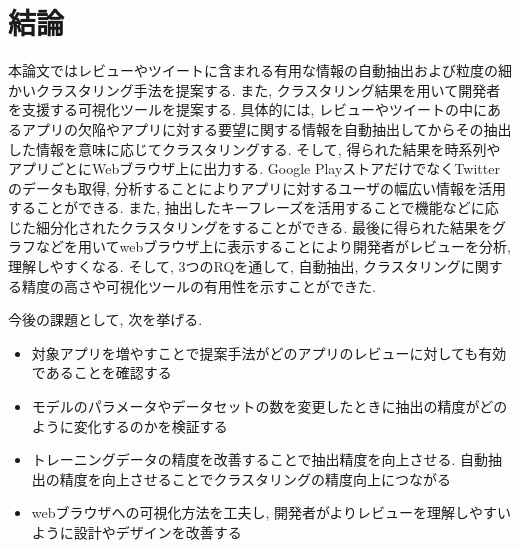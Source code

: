 \chapter{結論}
\label{chap:keturon}

本論文ではレビューやツイートに含まれる有用な情報の自動抽出および粒度の細かいクラスタリング手法を提案する. また, クラスタリング結果を用いて開発者を支援する可視化ツールを提案する. 
具体的には, レビューやツイートの中にあるアプリの欠陥やアプリに対する要望に関する情報を自動抽出してからその抽出した情報を意味に応じてクラスタリングする.  そして, 得られた結果を時系列やアプリごとにWebブラウザ上に出力する.
Google PlayストアだけでなくTwitterのデータも取得, 分析することによりアプリに対するユーザの幅広い情報を活用することができる. また, 抽出したキーフレーズを活用することで機能などに応じた細分化されたクラスタリングをすることができる. 最後に得られた結果をグラフなどを用いてwebブラウザ上に表示することにより開発者がレビューを分析, 理解しやすくなる. 
そして, 3つのRQを通して, 自動抽出, クラスタリングに関する精度の高さや可視化ツールの有用性を示すことができた. 

今後の課題として, 次を挙げる. 

\begin{itemize}
    \item 対象アプリを増やすことで提案手法がどのアプリのレビューに対しても有効であることを確認する
    \item モデルのパラメータやデータセットの数を変更したときに抽出の精度がどのように変化するのかを検証する
    \item トレーニングデータの精度を改善することで抽出精度を向上させる. 自動抽出の精度を向上させることでクラスタリングの精度向上につながる
    \item webブラウザへの可視化方法を工夫し, 開発者がよりレビューを理解しやすいように設計やデザインを改善する
\end{itemize}

